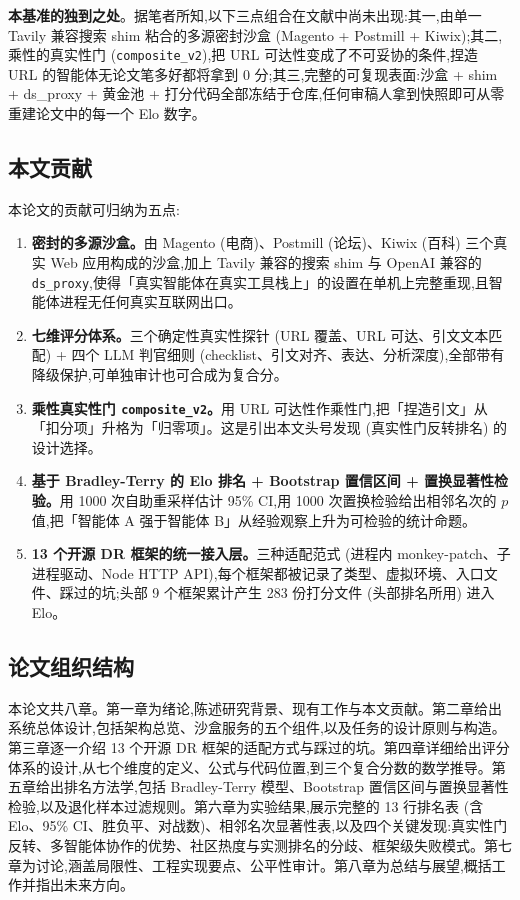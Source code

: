 \documentclass[UTF8,a4paper,12pt,oneside]{ctexart}
\begin{document}
\textbf{本基准的独到之处}。据笔者所知,以下三点组合在文献中尚未出现:其一,由单一 Tavily 兼容搜索 shim 粘合的多源密封沙盒 (Magento + Postmill + Kiwix);其二,乘性的真实性门 (\texttt{composite\_v2}),把 URL 可达性变成了不可妥协的条件,捏造 URL 的智能体无论文笔多好都将拿到 0 分;其三,完整的可复现表面:沙盒 + shim + ds\_proxy + 黄金池 + 打分代码全部冻结于仓库,任何审稿人拿到快照即可从零重建论文中的每一个 Elo 数字。

\subsection{本文贡献}

本论文的贡献可归纳为五点:

\begin{enumerate}[leftmargin=2em]
\item \textbf{密封的多源沙盒。}由 Magento (电商)、Postmill (论坛)、Kiwix (百科) 三个真实 Web 应用构成的沙盒,加上 Tavily 兼容的搜索 shim 与 OpenAI 兼容的 \texttt{ds\_proxy},使得「真实智能体在真实工具栈上」的设置在单机上完整重现,且智能体进程无任何真实互联网出口。
\item \textbf{七维评分体系。}三个确定性真实性探针 (URL 覆盖、URL 可达、引文文本匹配) + 四个 LLM 判官细则 (checklist、引文对齐、表达、分析深度),全部带有降级保护,可单独审计也可合成为复合分。
\item \textbf{乘性真实性门 \texttt{composite\_v2}。}用 URL 可达性作乘性门,把「捏造引文」从「扣分项」升格为「归零项」。这是引出本文头号发现 (真实性门反转排名) 的设计选择。
\item \textbf{基于 Bradley-Terry 的 Elo 排名 + Bootstrap 置信区间 + 置换显著性检验。}用 1000 次自助重采样估计 95\% CI,用 1000 次置换检验给出相邻名次的 \(p\) 值,把「智能体 A 强于智能体 B」从经验观察上升为可检验的统计命题。
\item \textbf{13 个开源 DR 框架的统一接入层。}三种适配范式 (进程内 monkey-patch、子进程驱动、Node HTTP API),每个框架都被记录了类型、虚拟环境、入口文件、踩过的坑;头部 9 个框架累计产生 283 份打分文件 (头部排名所用) 进入 Elo。
\end{enumerate}

\subsection{论文组织结构}

本论文共八章。第一章为绪论,陈述研究背景、现有工作与本文贡献。第二章给出系统总体设计,包括架构总览、沙盒服务的五个组件,以及任务的设计原则与构造。第三章逐一介绍 13 个开源 DR 框架的适配方式与踩过的坑。第四章详细给出评分体系的设计,从七个维度的定义、公式与代码位置,到三个复合分数的数学推导。第五章给出排名方法学,包括 Bradley-Terry 模型、Bootstrap 置信区间与置换显著性检验,以及退化样本过滤规则。第六章为实验结果,展示完整的 13 行排名表 (含 Elo、95\% CI、胜负平、对战数)、相邻名次显著性表,以及四个关键发现:真实性门反转、多智能体协作的优势、社区热度与实测排名的分歧、框架级失败模式。第七章为讨论,涵盖局限性、工程实现要点、公平性审计。第八章为总结与展望,概括工作并指出未来方向。
\end{document}
